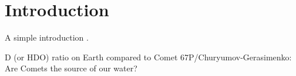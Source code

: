 
\section{Introduction}
A simple introduction \cite[p.~199]{nobody}.

D (or HDO) ratio on Earth compared to Comet 67P/Churyumov-Gerasimenko: Are Comets the source of our water?